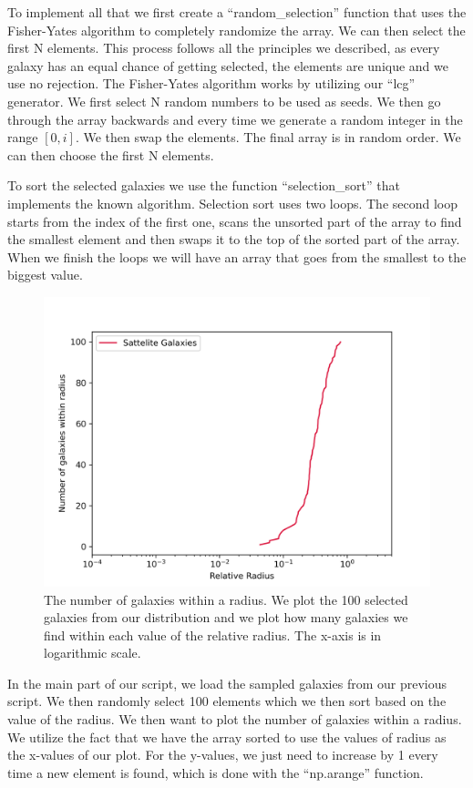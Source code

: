 \documentclass[a4paper,10pt]{article}
\begin{document}
To implement all that we first create a ``random\_selection'' function that uses the Fisher-Yates algorithm to completely randomize the array. We can then select the first N elements. This process follows all the principles we described, as every galaxy has an equal chance of getting selected, the elements are unique and we use no rejection. The Fisher-Yates algorithm works by utilizing our ``lcg'' generator. We first select N random numbers to be used as seeds. We then go through the array backwards and every time we generate a random integer in the range $[0,i]$. We then swap the elements. The final array is in random order. We can then choose the first N elements. 

To sort the selected galaxies we use the function ``selection\_sort'' that implements the known algorithm. Selection sort uses two loops. The second loop starts from the index of the first one, scans the unsorted part of the array to find the smallest element and then swaps it to the top of the sorted part of the array. When we finish the loops we will have an array that goes from the smallest to the biggest value.   



\begin{figure}[H]
  \centering
  \includegraphics[width=0.6\linewidth]{./plots/rand_sort.png}
  \caption{The number of galaxies within a radius. We plot the 100 selected galaxies from our distribution and we plot how many galaxies we find within each value of the relative radius. The x-axis is in logarithmic scale.}
  \label{fig:sort}
\end{figure}

In the main part of our script, we load the sampled galaxies from our previous script. We then randomly select 100 elements which we then sort based on the value of the radius. We then want to plot the number of galaxies within a radius. We utilize the fact that we have the array sorted to use the values of radius as the x-values of our plot. For the y-values, we just need to increase by 1 every time a new element is found, which is done with the ``np.arange'' function. 
\end{document}
